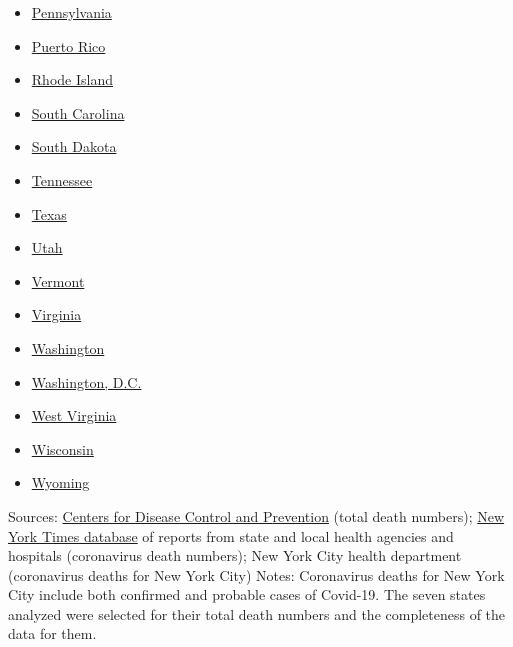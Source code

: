 \begin{itemize}
\item
  \href{https://www.nytimes.com/interactive/2020/us/pennsylvania-coronavirus-cases.html}{Pennsylvania}
\item
  \href{https://www.nytimes.com/interactive/2020/us/puerto-rico-coronavirus-cases.html}{Puerto
  Rico}
\item
  \href{https://www.nytimes.com/interactive/2020/us/rhode-island-coronavirus-cases.html}{Rhode
  Island}
\item
  \href{https://www.nytimes.com/interactive/2020/us/south-carolina-coronavirus-cases.html}{South
  Carolina}
\item
  \href{https://www.nytimes.com/interactive/2020/us/south-dakota-coronavirus-cases.html}{South
  Dakota}
\item
  \href{https://www.nytimes.com/interactive/2020/us/tennessee-coronavirus-cases.html}{Tennessee}
\item
  \href{https://www.nytimes.com/interactive/2020/us/texas-coronavirus-cases.html}{Texas}
\item
  \href{https://www.nytimes.com/interactive/2020/us/utah-coronavirus-cases.html}{Utah}
\item
  \href{https://www.nytimes.com/interactive/2020/us/vermont-coronavirus-cases.html}{Vermont}
\item
  \href{https://www.nytimes.com/interactive/2020/us/virginia-coronavirus-cases.html}{Virginia}
\item
  \href{https://www.nytimes.com/interactive/2020/us/washington-coronavirus-cases.html}{Washington}
\item
  \href{https://www.nytimes.com/interactive/2020/us/washington-dc-coronavirus-cases.html}{Washington,
  D.C.}
\item
  \href{https://www.nytimes.com/interactive/2020/us/west-virginia-coronavirus-cases.html}{West
  Virginia}
\item
  \href{https://www.nytimes.com/interactive/2020/us/wisconsin-coronavirus-cases.html}{Wisconsin}
\item
  \href{https://www.nytimes.com/interactive/2020/us/wyoming-coronavirus-cases.html}{Wyoming}
\end{itemize}

Sources: \href{https://www.cdc.gov/nchs/nvss/vsrr/covid_weekly/}{Centers
for Disease Control and
P}\href{https://www.cdc.gov/nchs/nvss/vsrr/covid_weekly/}{revention}
(total death numbers);
\href{https://www.nytimes.com/interactive/2020/us/coronavirus-us-cases.html}{New
York Times database} of reports from state and local health agencies and
hospitals (coronavirus death numbers); New York City health department
(coronavirus deaths for New York City) \textbar{} Notes: Coronavirus
deaths for New York City include both confirmed and probable cases of
Covid-19. The seven states analyzed were selected for their total death
numbers and the completeness of the data for them.


